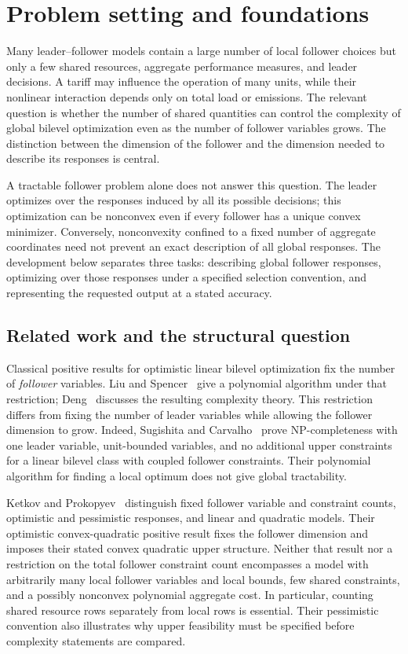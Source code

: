 \section{Problem setting and foundations}\label{sec:foundations}

Many leader--follower models contain a large number of local follower
choices but only a few shared resources, aggregate performance measures,
and leader decisions. A tariff may influence the operation of many units,
while their nonlinear interaction depends only on total load or emissions.
The relevant question is whether the number of shared quantities can
control the complexity of global bilevel optimization even as the number
of follower variables grows. The distinction between the dimension of the
follower and the dimension needed to describe its responses is central.

A tractable follower problem alone does not answer this question. The
leader optimizes over the responses induced by all its possible decisions;
this optimization can be nonconvex even if every follower has a unique
convex minimizer. Conversely, nonconvexity confined to a fixed number of
aggregate coordinates need not prevent an exact description of all global
responses. The development below separates three tasks: describing global
follower responses, optimizing over those responses under a specified
selection convention, and representing the requested output at a stated
accuracy.

\subsection{Related work and the structural question}\label{subsec:related}

Classical positive results for optimistic linear bilevel optimization fix
the number of \emph{follower} variables. Liu and Spencer~\cite{LiuSpencer1995} give a
polynomial algorithm under that restriction; Deng~\cite{Deng1998}
discusses the resulting complexity theory. This restriction differs from
fixing the number of leader variables while allowing the follower dimension
to grow. Indeed, Sugishita and Carvalho~\cite{SugishitaCarvalho2026} prove
NP-completeness with one leader variable, unit-bounded variables, and no
additional upper constraints for a linear bilevel class with coupled
follower constraints. Their polynomial algorithm for finding a local
optimum does not give global tractability.

Ketkov and Prokopyev~\cite{KetkovProkopyev2026} distinguish fixed follower
variable and constraint counts, optimistic and pessimistic responses, and
linear and quadratic models. Their optimistic convex-quadratic positive
result fixes the follower dimension and imposes their stated convex
quadratic upper structure. Neither that result nor a restriction on the
total follower constraint count encompasses a model with arbitrarily many
local follower variables and local bounds, few shared constraints, and a
possibly nonconvex polynomial aggregate cost. In particular, counting
shared resource rows separately from local rows is essential. Their
pessimistic convention also illustrates why upper feasibility must be
specified before complexity statements are compared.

